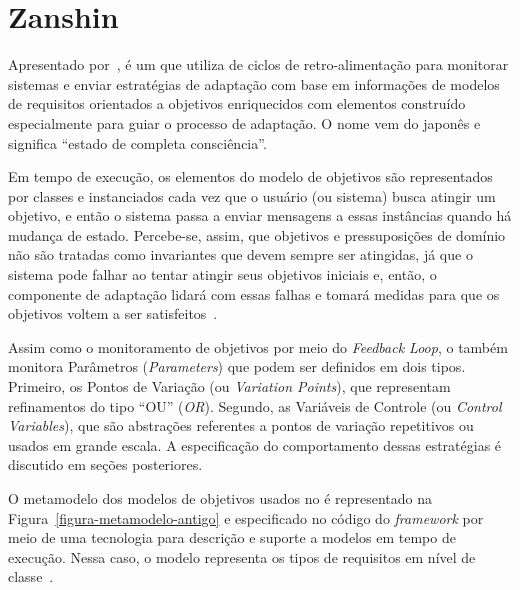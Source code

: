 
\section{Zanshin}
\label{sec-referencial-zanshin}

Apresentado por~, \zanshin é um \framework que utiliza de ciclos de retro-alimentação para monitorar sistemas e enviar estratégias de adaptação com base em informações de modelos de requisitos orientados a objetivos enriquecidos com elementos construído especialmente para guiar o processo de adaptação. O nome \zanshin vem do japonês e significa ``estado de completa consciência''.

Em tempo de execução, os elementos do modelo de objetivos são representados por classes e instanciados cada vez que o usuário (ou sistema) busca atingir um objetivo, e então o sistema passa a enviar mensagens a essas instâncias quando há mudança de estado. Percebe-se, assim, que objetivos e pressuposições de domínio não são tratadas como invariantes que devem sempre ser atingidas, já que o sistema pode falhar ao tentar atingir seus objetivos iniciais e, então, o componente de adaptação lidará com essas falhas e tomará medidas para que os objetivos voltem a ser satisfeitos~\cite{souza2013requirements}.

Assim como o monitoramento de objetivos por meio do \textit{Feedback Loop}, o \zanshin também monitora Parâmetros (\textit{Parameters}) que podem ser definidos em dois tipos. Primeiro, os Pontos de Variação (ou \textit{Variation Points}), que representam refinamentos do tipo ``OU'' (\textit{OR}). Segundo, as Variáveis de Controle (ou \textit{Control Variables}), que são abstrações referentes a pontos de variação repetitivos ou usados em grande escala. A especificação do comportamento dessas estratégias é discutido em seções posteriores.

O metamodelo dos modelos de objetivos usados no \zanshin é representado na Figura~\ref{figura-metamodelo-antigo} e especificado no código do \textit{framework} por meio	 de uma tecnologia \ecore para descrição e suporte a modelos em tempo de execução. Nessa caso, o modelo representa os tipos de requisitos em nível de classe~\cite{souza2013requirements}. 



